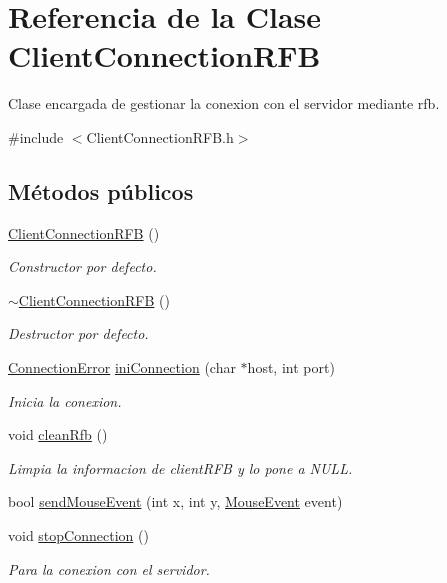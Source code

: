 \hypertarget{classClientConnectionRFB}{\section{Referencia de la Clase Client\-Connection\-R\-F\-B}
\label{classClientConnectionRFB}
}


Clase encargada de gestionar la conexion con el servidor mediante rfb.  




{\ttfamily \#include $<$Client\-Connection\-R\-F\-B.\-h$>$}

\subsection*{Métodos públicos}
\begin{DoxyCompactItemize}
\item 
\hyperlink{classClientConnectionRFB_ae7789d8f42a5ff2b6b62e20ce1997891}{Client\-Connection\-R\-F\-B} ()
\begin{DoxyCompactList}\small\item\em Constructor por defecto. \end{DoxyCompactList}\item 
\hyperlink{classClientConnectionRFB_a6a0cc84c190e83dfda21f7b9a922bf51}{$\sim$\-Client\-Connection\-R\-F\-B} ()
\begin{DoxyCompactList}\small\item\em Destructor por defecto. \end{DoxyCompactList}\item 
\hyperlink{CommonType_8h_a3eb2ebd912cc5460d23e45f7188a0a86}{Connection\-Error} \hyperlink{classClientConnectionRFB_a10f5844b2c660c62f3ab7dbf8970e651}{ini\-Connection} (char $\ast$host, int port)
\begin{DoxyCompactList}\small\item\em Inicia la conexion. \end{DoxyCompactList}\item 
void \hyperlink{classClientConnectionRFB_a6d2a65faea61da0fac61aaeaf3eae640}{clean\-Rfb} ()
\begin{DoxyCompactList}\small\item\em Limpia la informacion de client\-R\-F\-B y lo pone a N\-U\-L\-L. \end{DoxyCompactList}\item 
bool \hyperlink{classClientConnectionRFB_aada8dfc1d985e0ff47aa058a2200598d}{send\-Mouse\-Event} (int x, int y, \hyperlink{CommonType_8h_a5f278706f235727f39ae168af63b1d99}{Mouse\-Event} event)
\item 
void \hyperlink{classClientConnectionRFB_acee39ded0ad8c2f33adbde7e02d78137}{stop\-Connection} ()
\begin{DoxyCompactList}\small\item\em Para la conexion con el servidor. \end{DoxyCompactList}\end{DoxyCompactItemize}
